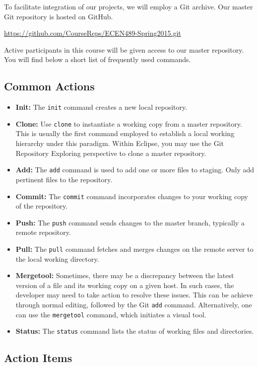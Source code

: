 \documentclass[letterpaper,11pt]{article}
\begin{document}
To facilitate integration of our projects, we will employ a Git archive.
Our master Git repository is hosted on GitHub.
\begin{center}
\url{https://github.com/CourseReps/ECEN489-Spring2015.git}
\end{center}
Active participants in this course will be given access to our master repository.
You will find below a short list of frequently used commands.


\subsection*{Common Actions}

\begin{itemize}
\item \textbf{Init:}
The \texttt{init} command creates a new local repository.
\item \textbf{Clone:}
Use \texttt{clone} to instantiate a working copy from a master repository.
This is usually the first command employed to establish a local working hierarchy under this paradigm.
Within Eclipse, you may use the Git Repository Exploring perspective to clone a master repository.
\item \textbf{Add:}
The \texttt{add} command is used to add one or more files to staging.
Only add pertinent files to the repository.
\item \textbf{Commit:}
The \texttt{commit} command incorporates changes to your working copy of the repository.
\item \textbf{Push:}
The \texttt{push} command sends changes to the master branch, typically a remote repository.
\item \textbf{Pull:}
The \texttt{pull} command fetches and merges changes on the remote server to the local working directory.
\item \textbf{Mergetool:}
Sometimes, there may be a discrepancy between the latest version of a file and its working copy on a given host.
In such cases, the developer may need to take action to resolve these issues.
This can be achieve through normal editing, followed by the Git \texttt{add} command.
Alternatively, one can use the  \texttt{mergetool} command, which initiates a visual tool.
\item \textbf{Status:}
The \texttt{status} command lists the status of working files and directories.
\end{itemize}


\subsection*{Action Items}
\end{document}
